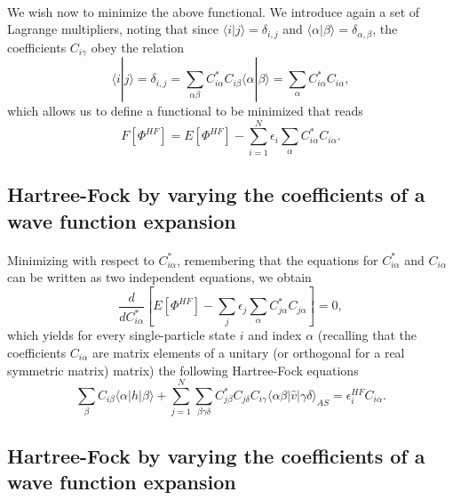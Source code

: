 \documentclass[%
twoside,                 %
final,                   %
10pt]{article}
\begin{document}
\paragraph{}
We wish now to minimize the above functional. We introduce again a set of Lagrange multipliers, noting that
since $\langle i | j \rangle = \delta_{i,j}$ and $\langle \alpha | \beta \rangle = \delta_{\alpha,\beta}$, 
the coefficients $C_{i\gamma}$ obey the relation
\[
 \langle i | j \rangle=\delta_{i,j}=\sum_{\alpha\beta} C^*_{i\alpha}C_{i\beta}\langle \alpha | \beta \rangle=
\sum_{\alpha} C^*_{i\alpha}C_{i\alpha},
\]
which allows us to define a functional to be minimized that reads
\begin{equation}
  F[\Phi^{HF}]=E[\Phi^{HF}] - \sum_{i=1}^N\epsilon_i\sum_{\alpha} C^*_{i\alpha}C_{i\alpha}.
\end{equation}





\subsection{Hartree-Fock by varying the coefficients of a wave function expansion}

\paragraph{}
Minimizing with respect to $C^*_{i\alpha}$, remembering that the equations for $C^*_{i\alpha}$ and $C_{i\alpha}$
can be written as two  independent equations, we obtain
\[
\frac{d}{dC^*_{i\alpha}}\left[  E[\Phi^{HF}] - \sum_{j}\epsilon_j\sum_{\alpha} C^*_{j\alpha}C_{j\alpha}\right]=0,
\]
which yields for every single-particle state $i$ and index $\alpha$ (recalling that the coefficients $C_{i\alpha}$ are matrix elements of a unitary (or orthogonal for a real symmetric matrix) matrix)
the following Hartree-Fock equations
\[
\sum_{\beta} C_{i\beta}\langle \alpha | h | \beta \rangle+
\sum_{j=1}^N\sum_{\beta\gamma\delta} C^*_{j\beta}C_{j\delta}C_{i\gamma}\langle \alpha\beta|\hat{v}|\gamma\delta\rangle_{AS}=\epsilon_i^{HF}C_{i\alpha}.
\]



\subsection{Hartree-Fock by varying the coefficients of a wave function expansion}
\end{document}
